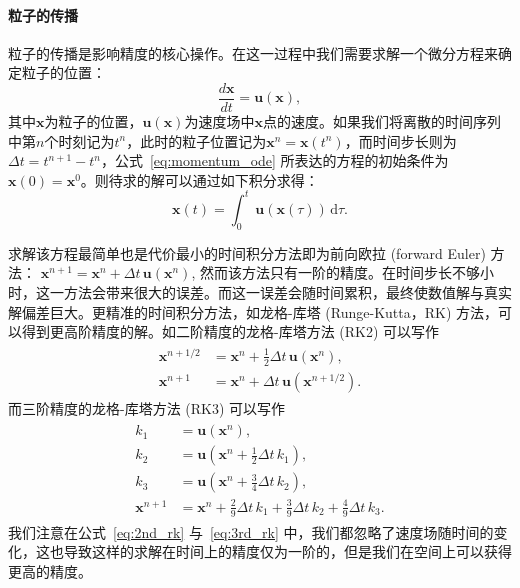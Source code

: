 \paragraph{粒子的传播}
粒子的传播是影响精度的核心操作。在这一过程中我们需要求解一个微分方程来确定粒子的位置：
\begin{equation}
    \frac{d \mathbf{x}}{d t}=\mathbf{u}(\mathbf{x}),
    \label{eq:momentum_ode}
\end{equation}
其中$\mathbf{x}$为粒子的位置，$\mathbf{u}(\mathbf{x})$为速度场中$\mathbf{x}$点的速度。如果我们将离散的时间序列中第$n$个时刻记为$t^n$，此时的粒子位置记为$\mathbf{x}^{n}=\mathbf{x}(t^{n})$，而时间步长则为$\Delta t=t^{n+1}-t^{n}$，公式~\ref{eq:momentum_ode} 所表达的方程的初始条件为$\mathbf{x}(0)=\mathbf{x}^{0}$。则待求的解可以通过如下积分求得：
\begin{equation}
    \mathbf{x}(t)=\int_{0}^{t} \, \mathbf{u}(\mathbf{x}(\tau)) \, \mathrm{d}\tau.
\end{equation}

求解该方程最简单也是代价最小的时间积分方法即为前向欧拉 (forward Euler) 方法：
$\mathbf{x}^{n+1}=\mathbf{x}^{n}+\Delta t \, \mathbf{u}(\mathbf{x}^{n})$,
然而该方法只有一阶的精度。在时间步长不够小时，这一方法会带来很大的误差。而这一误差会随时间累积，最终使数值解与真实解偏差巨大。更精准的时间积分方法，如龙格-库塔 (Runge-Kutta，RK) 方法，可以得到更高阶精度的解。如二阶精度的龙格-库塔方法 (RK2) 可以写作
\begin{align}
    \begin{split}
    \mathbf{x}^{n+1 / 2} & =\mathbf{x}^n+\frac{1}{2} \Delta t \, \mathbf{u}(\mathbf{x}^n), \\
    \mathbf{x}^{n+1} & =\mathbf{x}^n+\Delta t \, \mathbf{u}(\mathbf{x}^{n+1 / 2}) .
\end{split}
\label{eq:2nd_rk}
\end{align}
而三阶精度的龙格-库塔方法 (RK3) 可以写作
\begin{align}
    \begin{split}
k_1 & =\mathbf{u}(\mathbf{x}^n), \\
k_2 & =\mathbf{u}(\mathbf{x}^n+\frac{1}{2} \Delta t \, k_1), \\
k_3 & =\mathbf{u}(\mathbf{x}^n+\frac{3}{4} \Delta t \, k_2), \\
\mathbf{x}^{n+1} & =\mathbf{x}^n+\frac{2}{9} \Delta t \, k_1+\frac{3}{9} \Delta t \, k_2+\frac{4}{9} \Delta t \, k_3 .
    \end{split}
    \label{eq:3rd_rk}
\end{align}
我们注意在公式~\ref{eq:2nd_rk} 与~\ref{eq:3rd_rk} 中，我们都忽略了速度场随时间的变化，这也导致这样的求解在时间上的精度仅为一阶的，但是我们在空间上可以获得更高的精度。

